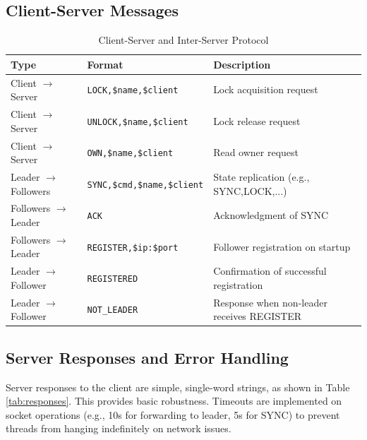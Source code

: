 \documentclass[a4paper,11pt]{article}
\begin{document}
\subsection*{Client-Server Messages}
\begin{table}[htbp]
\centering
\caption{Client-Server and Inter-Server Protocol}
\label{tab:protocol}
\begin{tabular}{@{}lll@{}}
\toprule
\textbf{Type} & \textbf{Format} & \textbf{Description} \\
\midrule
Client $\rightarrow$ Server & \texttt{LOCK,\$name,\$client} & Lock acquisition request \\
Client $\rightarrow$ Server & \texttt{UNLOCK,\$name,\$client} & Lock release request \\
Client $\rightarrow$ Server & \texttt{OWN,\$name,\$client} & Read owner request \\
Leader $\rightarrow$ Followers & \texttt{SYNC,\$cmd,\$name,\$client} & State replication (e.g., SYNC,LOCK,...) \\
Followers $\rightarrow$ Leader & \texttt{ACK} & Acknowledgment of SYNC \\
Followers $\rightarrow$ Leader & \texttt{REGISTER,\$ip:\$port} & Follower registration on startup \\
Leader $\rightarrow$ Follower & \texttt{REGISTERED} & Confirmation of successful registration \\
Leader $\rightarrow$ Follower & \texttt{NOT\_LEADER} & Response when non-leader receives REGISTER \\
\bottomrule
\end{tabular}
\end{table}

\subsection*{Server Responses and Error Handling}
Server responses to the client are simple, single-word strings, as shown in Table \ref{tab:responses}. This provides basic robustness. Timeouts are implemented on socket operations (e.g., 10s for forwarding to leader, 5s for SYNC) to prevent threads from hanging indefinitely on network issues.
\end{document}
